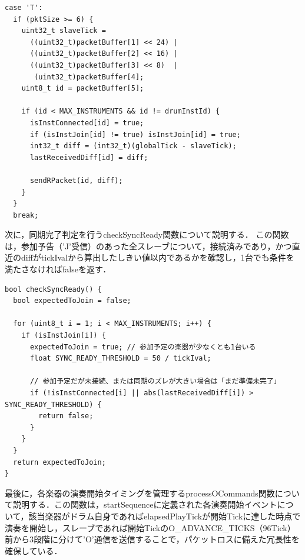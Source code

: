 \begin{lstlisting}[caption={drum\_0706.inoのloop関数（'T'通信受信部分）}, label={lst:douki_master_t}]
case 'T':
  if (pktSize >= 6) {
    uint32_t slaveTick =
      ((uint32_t)packetBuffer[1] << 24) |
      ((uint32_t)packetBuffer[2] << 16) |
      ((uint32_t)packetBuffer[3] << 8)  |
       (uint32_t)packetBuffer[4];
    uint8_t id = packetBuffer[5];

    if (id < MAX_INSTRUMENTS && id != drumInstId) {
      isInstConnected[id] = true;
      if (isInstJoin[id] != true) isInstJoin[id] = true;
      int32_t diff = (int32_t)(globalTick - slaveTick);
      lastReceivedDiff[id] = diff;

      sendRPacket(id, diff);
    }
  }
  break;
\end{lstlisting}

\fi

\iffalse
次に，同期完了判定を行うcheckSyncReady関数について説明する．
この関数は，参加予告（'J'受信）のあった全スレーブについて，接続済みであり，かつ直近のdiffがtickIvalから算出したしきい値以内であるかを確認し，1台でも条件を満たさなければfalseを返す．

\begin{lstlisting}[caption={checkSyncReady関数}, label={lst:douki_checksyncready}]
bool checkSyncReady() {
  bool expectedToJoin = false;

  for (uint8_t i = 1; i < MAX_INSTRUMENTS; i++) {
    if (isInstJoin[i]) {
      expectedToJoin = true; // 参加予定の楽器が少なくとも1台いる
      float SYNC_READY_THRESHOLD = 50 / tickIval;

      // 参加予定だが未接続、または同期のズレが大きい場合は「まだ準備未完了」
      if (!isInstConnected[i] || abs(lastReceivedDiff[i]) > SYNC_READY_THRESHOLD) {
        return false;
      }
    }
  }
  return expectedToJoin;
}
\end{lstlisting}


最後に，各楽器の演奏開始タイミングを管理するprocessOCommands関数について説明する．この関数は，startSequenceに定義された各演奏開始イベントについて，該当楽器がドラム自身であればelapsedPlayTickが開始Tickに達した時点で演奏を開始し，スレーブであれば開始TickのO\_ADVANCE\_TICKS（96Tick）前から3段階に分けて'O'通信を送信することで，パケットロスに備えた冗長性を確保している．

